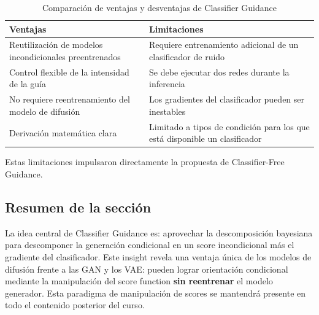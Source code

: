 \begin{table}[H]
\centering
\begin{tabular}{p{6cm}p{6cm}}
\toprule
\textbf{Ventajas} & \textbf{Limitaciones} \\
\midrule
Reutilización de modelos incondicionales preentrenados & Requiere entrenamiento adicional de un clasificador de ruido \\
Control flexible de la intensidad de la guía & Se debe ejecutar dos redes durante la inferencia \\
No requiere reentrenamiento del modelo de difusión & Los gradientes del clasificador pueden ser inestables \\
Derivación matemática clara & Limitado a tipos de condición para los que está disponible un clasificador \\
\bottomrule
\end{tabular}
\caption{Comparación de ventajas y desventajas de Classifier Guidance}
\end{table}

Estas limitaciones impulsaron directamente la propuesta de Classifier-Free Guidance.

\subsection{Resumen de la sección}

La idea central de Classifier Guidance es: aprovechar la descomposición bayesiana para descomponer la generación condicional en un score incondicional más el gradiente del clasificador. Este insight revela una ventaja única de los modelos de difusión frente a las GAN y los VAE: pueden lograr orientación condicional mediante la manipulación del score function \textbf{sin reentrenar} el modelo generador. Esta paradigma de manipulación de scores se mantendrá presente en todo el contenido posterior del curso.

\newpage
